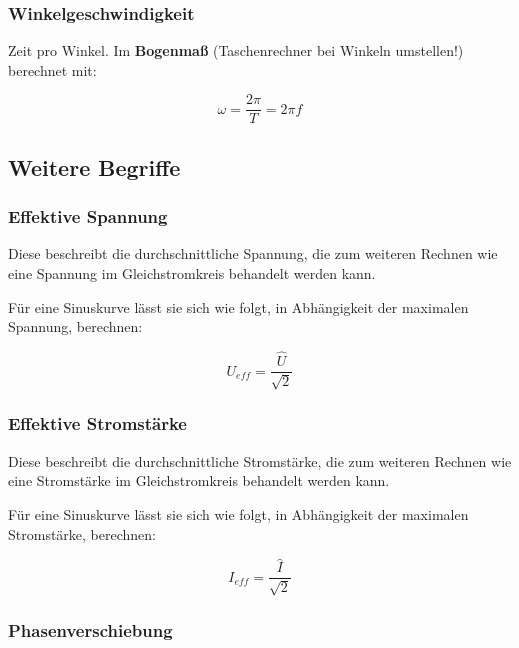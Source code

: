 \subsubsection{Winkelgeschwindigkeit}

Zeit pro Winkel. Im \textbf{Bogenmaß} (Taschenrechner bei Winkeln umstellen!) berechnet mit:

\begin{equation}	\label{eq:Winkelgeschwindigkeit}
	\omega = \frac{2\pi}{T} = 2\pi f
\end{equation}



\subsection{Weitere Begriffe}	\label{subsec:ErlaeuterungenWeitere}

\subsubsection{Effektive Spannung}

Diese beschreibt die durchschnittliche Spannung, die zum weiteren Rechnen wie eine Spannung im Gleichstromkreis behandelt werden kann.

Für eine Sinuskurve lässt sie sich wie folgt, in Abhängigkeit der maximalen Spannung, berechnen:

\begin{equation}	\label{eq:EffektiveSpannung}
	U_{eff}=\frac{\hat{U}}{\sqrt{2}}
\end{equation}


\subsubsection{Effektive Stromstärke}

Diese beschreibt die durchschnittliche Stromstärke, die zum weiteren Rechnen wie eine Stromstärke im Gleichstromkreis behandelt werden kann.

Für eine Sinuskurve lässt sie sich wie folgt, in Abhängigkeit der maximalen Stromstärke, berechnen:

\begin{equation}	\label{eq:EffektiveStromstaerke}
	I_{eff}=\frac{\hat{I}}{\sqrt{2}}
\end{equation}


\subsubsection{Phasenverschiebung}

